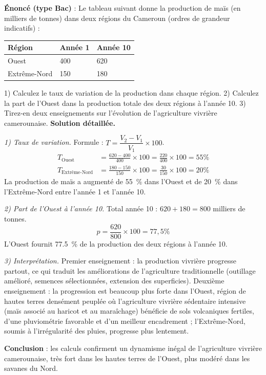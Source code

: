 \documentclass[11pt]{article}
\begin{document}
\begin{exoresolu}
\textbf{Énoncé (type Bac)} : Le tableau suivant donne la production de maïs (en milliers de tonnes) dans deux régions du Cameroun (ordres de grandeur indicatifs) :
\begin{center}
\begin{tabularx}{\linewidth}{|l|X|X|}\hline
\rowcolor{popblueL} \textbf{Région} & \textbf{Année 1} & \textbf{Année 10} \\ \hline
Ouest & 400 & 620 \\ \hline
Extrême-Nord & 150 & 180 \\ \hline
\end{tabularx}
\end{center}
1) Calculez le taux de variation de la production dans chaque région. 2) Calculez la part de l'Ouest dans la production totale des deux régions à l'année 10. 3) Tirez-en deux enseignements sur l'évolution de l'agriculture vivrière camerounaise.
\tcblower
\textbf{Solution détaillée.}

\emph{1) Taux de variation.} Formule : $T=\dfrac{V_{2}-V_{1}}{V_{1}}\times 100$.
\begin{align*}
T_{\text{Ouest}} &= \frac{620-400}{400}\times 100 = \frac{220}{400}\times 100 = 55\%\\
T_{\text{Extrême-Nord}} &= \frac{180-150}{150}\times 100 = \frac{30}{150}\times 100 = 20\%
\end{align*}
La production de maïs a augmenté de \SI{55}{\%} dans l'Ouest et de \SI{20}{\%} dans l'Extrême-Nord entre l'année 1 et l'année 10.

\emph{2) Part de l'Ouest à l'année 10.} Total année 10 : $620+180=800$ milliers de tonnes.
\[p = \frac{620}{800}\times 100 = 77,5\%\]
L'Ouest fournit \SI{77,5}{\%} de la production des deux régions à l'année 10.

\emph{3) Interprétation.} Premier enseignement : la production vivrière progresse partout, ce qui traduit les améliorations de l'agriculture traditionnelle (outillage amélioré, semences sélectionnées, extension des superficies). Deuxième enseignement : la progression est beaucoup plus forte dans l'Ouest, région de hautes terres densément peuplée où l'agriculture vivrière sédentaire intensive (maïs associé au haricot et au maraîchage) bénéficie de sols volcaniques fertiles, d'une pluviométrie favorable et d'un meilleur encadrement ; l'Extrême-Nord, soumis à l'irrégularité des pluies, progresse plus lentement.

\textbf{Conclusion} : les calculs confirment un dynamisme inégal de l'agriculture vivrière camerounaise, très fort dans les hautes terres de l'Ouest, plus modéré dans les savanes du Nord.
\end{exoresolu}
\end{document}

